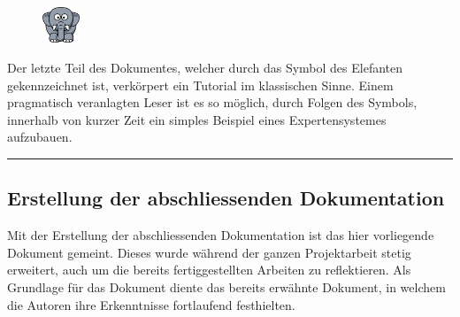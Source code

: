 \vspace{30pt}

\begin{figure}
    \vspace{-18pt}
    \includegraphics[width=0.1\textwidth]{bilder/elephant.png}\protect\footnotemark{}
\end{figure}
Der letzte Teil des Dokumentes, welcher durch das Symbol des Elefanten gekennzeichnet ist, verkörpert ein Tutorial im klassischen Sinne. Einem pragmatisch veranlagten Leser ist es so möglich, durch Folgen des Symbols, innerhalb von kurzer Zeit ein simples Beispiel eines Expertensystemes aufzubauen.

\noindent\rule[1ex]{\textwidth}{1pt}

\subsection{Erstellung der abschliessenden Dokumentation}
\label{subsec:abschliessende_dokumentation}
Mit der Erstellung der abschliessenden Dokumentation ist das hier vorliegende Dokument gemeint. Dieses wurde während der ganzen Projektarbeit stetig erweitert, auch um die bereits fertiggestellten Arbeiten zu reflektieren. Als Grundlage für das Dokument diente das bereits erwähnte Dokument, in welchem die Autoren ihre Erkenntnisse fortlaufend festhielten.
